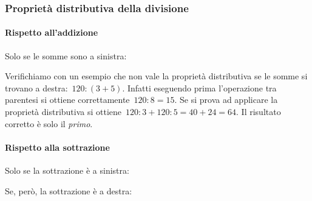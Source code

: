 
\vspace{.5em}

\subsubsection{Proprietà distributiva della divisione}

\paragraph{Rispetto all'addizione}
Solo se le somme sono a sinistra:

\vspace{.5em}

Verifichiamo con un esempio che non vale la proprietà distributiva se le 
somme si trovano a destra:~\(120 : (3 + 5)\).
Infatti eseguendo prima l'operazione tra parentesi si ottiene 
correttamente~\(120 : 8 = 15\). Se si prova ad applicare
la proprietà distributiva si ottiene~\(120 : 3 + 120 : 5 = 40 + 24 = 64\). 
Il risultato corretto è solo il \emph{primo}.

\paragraph{Rispetto alla sottrazione}
Solo se la sottrazione è a sinistra:

\vspace{.5em}

\vspace{.5em}
Se, però, la sottrazione è a destra:

